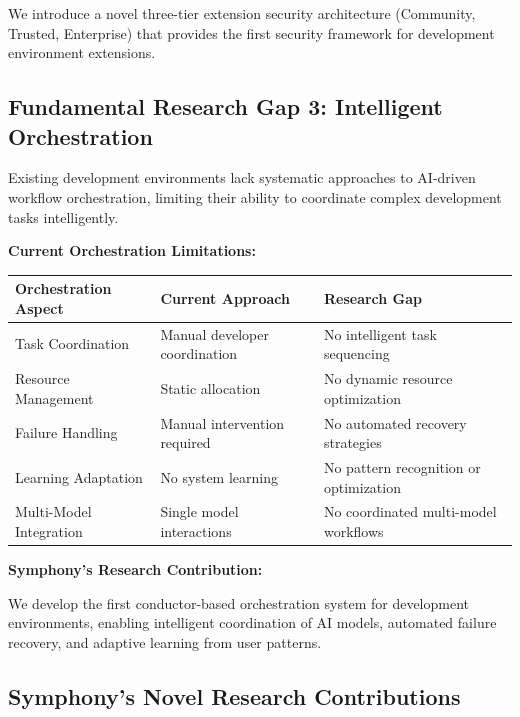 We introduce a novel three-tier extension security architecture (Community, Trusted, Enterprise) that provides the first security framework for development environment extensions.

\subsection{Fundamental Research Gap 3: Intelligent Orchestration}
\label{subsec:orchestration-gap}

Existing development environments lack systematic approaches to AI-driven workflow orchestration, limiting their ability to coordinate complex development tasks intelligently.

\textbf{Current Orchestration Limitations:}

\begin{center}
\begin{tabular}{@{}p{4cm}p{4cm}p{4cm}@{}}
\toprule
\textbf{Orchestration Aspect} & \textbf{Current Approach} & \textbf{Research Gap} \\
\midrule
Task Coordination & Manual developer coordination & No intelligent task sequencing \\
Resource Management & Static allocation & No dynamic resource optimization \\
Failure Handling & Manual intervention required & No automated recovery strategies \\
Learning Adaptation & No system learning & No pattern recognition or optimization \\
Multi-Model Integration & Single model interactions & No coordinated multi-model workflows \\
\bottomrule
\end{tabular}
\label{tab:orchestration-gaps}
\end{center}

\textbf{Symphony's Research Contribution:}

We develop the first conductor-based orchestration system for development environments, enabling intelligent coordination of AI models, automated failure recovery, and adaptive learning from user patterns.

\subsection{Symphony's Novel Research Contributions}
\label{subsec:research-contributions}

